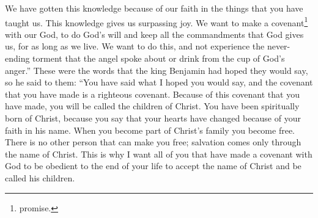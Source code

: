 \bverse \iffalse And it is the faith which we have had on the things which our king has spoken unto us that has brought us to this great knowledge, whereby we do rejoice with such exceedingly great joy. \fi
We have gotten this knowledge because of our faith in the things that you have taught us. This knowledge gives us surpassing joy.
\bverse \iffalse And we are willing to enter into a covenant with our God to do his will, and to be obedient to his commandments in all things that he shall command us, all the remainder of our days, that we may not bring upon ourselves a never-ending torment, as has been spoken by the angel, that we may not drink out of the cup of the wrath of God. \fi
We want to make a covenant\footnote{promise.} with our God, to do God's will and keep all the commandments that God gives us, for as long as we live. We want to do this, and not experience the never-ending torment that the angel spoke about or drink from the cup of God's anger.''
\bverse \iffalse And now, these are the words which king Benjamin desired of them; and therefore he said unto them: Ye have spoken the words that I desired; and the covenant which ye have made is a righteous covenant. \fi
These were the words that the king Benjamin had hoped they would say, so he said to them: ``You have said what I hoped you would say, and the covenant that you have made is a righteous covenant.
\bverse \iffalse And now, because of the covenant which ye have made ye shall be called the children of Christ, his sons, and his daughters; for behold, this day he hath spiritually begotten you; for ye say that your hearts are changed through faith on his name; therefore, ye are born of him and have become his sons and his daughters. \fi
Because of this covenant that you have made, you will be called the children of Christ. You have been spiritually born of Christ, because you say that your hearts have changed because of your faith in his name. 
\bverse \iffalse And under this head ye are made free, and there is no other head whereby ye can be made free. There is no other name given whereby salvation cometh; therefore, I would that ye should take upon you the name of Christ, all you that have entered into the covenant with God that ye should be obedient unto the end of your lives. \fi
When you become part of Christ's family you become free. There is no other person that can make you free; salvation comes only through the name of Christ. This is why I want all of you that have made a covenant with God to be obedient to the end of your life to accept the name of Christ and be called his children.
